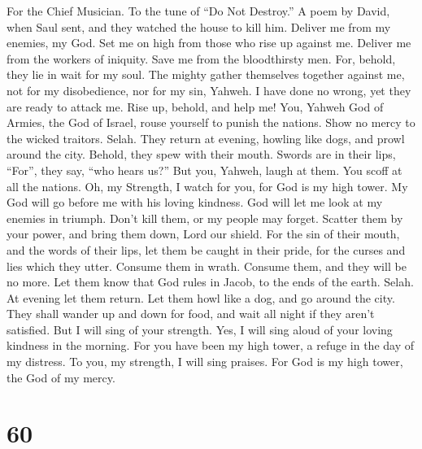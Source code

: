 For the Chief Musician. To the tune of ``Do Not Destroy.'' A poem by
David, when Saul sent, and they watched the house to kill him.
 Deliver me from my enemies, my God. Set me on high from
those who rise up against me.  Deliver me from the workers
of iniquity. Save me from the bloodthirsty men.  For,
behold, they lie in wait for my soul. The mighty gather themselves
together against me, not for my disobedience, nor for my sin, Yahweh.
 I have done no wrong, yet they are ready to attack me. Rise
up, behold, and help me!  You, Yahweh God of Armies, the God
of Israel, rouse yourself to punish the nations. Show no mercy to the
wicked traitors. Selah.  They return at evening, howling
like dogs, and prowl around the city.  Behold, they spew
with their mouth. Swords are in their lips, ``For'', they say, ``who
hears us?''  But you, Yahweh, laugh at them. You scoff at
all the nations.  Oh, my Strength, I watch for you, for God
is my high tower.  My God will go before me with his loving
kindness. God will let me look at my enemies in triumph. 
Don't kill them, or my people may forget. Scatter them by your power,
and bring them down, Lord our shield.  For the sin of their
mouth, and the words of their lips, let them be caught in their pride,
for the curses and lies which they utter.  Consume them in
wrath. Consume them, and they will be no more. Let them know that God
rules in Jacob, to the ends of the earth. Selah.  At
evening let them return. Let them howl like a dog, and go around the
city.  They shall wander up and down for food, and wait all
night if they aren't satisfied.  But I will sing of your
strength. Yes, I will sing aloud of your loving kindness in the morning.
For you have been my high tower, a refuge in the day of my distress.
 To you, my strength, I will sing praises. For God is my
high tower, the God of my mercy.

\hypertarget{section-58}{%
\section{60}\label{section-58}}

